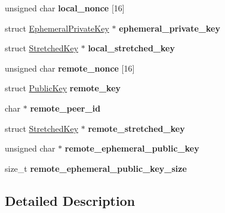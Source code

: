 \begin{DoxyCompactItemize}
\item 
\mbox{\label{struct_session_context_a809edb26c85696b72de067861c6c6357}} 
unsigned char {\bfseries local\+\_\+nonce} \mbox{[}16\mbox{]}
\item 
\mbox{\label{struct_session_context_a62f93a31f20e3c7c0b42a77be7672d09}} 
struct \mbox{\hyperlink{struct_ephemeral_private_key}{Ephemeral\+Private\+Key}} $\ast$ {\bfseries ephemeral\+\_\+private\+\_\+key}
\item 
\mbox{\label{struct_session_context_a42acab7f1e12d017259d5d52611ef021}} 
struct \mbox{\hyperlink{struct_stretched_key}{Stretched\+Key}} $\ast$ {\bfseries local\+\_\+stretched\+\_\+key}
\item 
\mbox{\label{struct_session_context_a343b856ec2d2e082bd485dd13e1f0a99}} 
unsigned char {\bfseries remote\+\_\+nonce} \mbox{[}16\mbox{]}
\item 
\mbox{\label{struct_session_context_a06019b40c8578bedf6667a684399966b}} 
struct \mbox{\hyperlink{struct_public_key}{Public\+Key}} {\bfseries remote\+\_\+key}
\item 
\mbox{\label{struct_session_context_a219cd6d6afa653a923e0215788b01d1d}} 
char $\ast$ {\bfseries remote\+\_\+peer\+\_\+id}
\item 
\mbox{\label{struct_session_context_a832186aa96e74b76fea291ff3b8bae81}} 
struct \mbox{\hyperlink{struct_stretched_key}{Stretched\+Key}} $\ast$ {\bfseries remote\+\_\+stretched\+\_\+key}
\item 
\mbox{\label{struct_session_context_ae6c4f3320749245aad67ff311ab7ca83}} 
unsigned char $\ast$ {\bfseries remote\+\_\+ephemeral\+\_\+public\+\_\+key}
\item 
\mbox{\label{struct_session_context_a6cd18642a869c775a712651d81fe5a3b}} 
size\+\_\+t {\bfseries remote\+\_\+ephemeral\+\_\+public\+\_\+key\+\_\+size}
\end{DoxyCompactItemize}


\subsection{Detailed Description}


